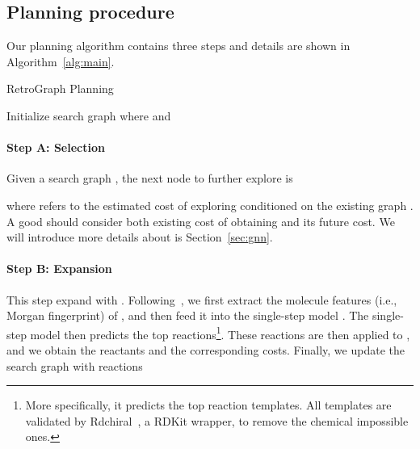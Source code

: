 \documentclass[sigconf]{acmart}
\begin{document}
\subsection{Planning procedure}
Our planning algorithm contains three steps and details are shown in Algorithm~\ref{alg:main}.



\begin{algorithm}[tb]
\caption{RetroGraph Planning}\label{alg:main}
Initialize search graph  where  and \;
\end{algorithm}

\paragraph{Step A: Selection}
Given a search graph , the next node to further explore is

where  refers to the estimated cost of exploring  conditioned on the existing graph . A good  should consider both existing cost of obtaining  and its future cost. We will introduce more details about  is Section~\ref{sec:gnn}. 


\paragraph{Step B: Expansion}
This step expand  with .
Following~\cite{Chen2020,Kim2021}, we first extract the molecule features (i.e., Morgan fingerprint) of , and then feed it into the single-step model .
The single-step model then predicts the top  reactions\footnote{More specifically, it predicts the top  reaction templates. All templates are validated by Rdchiral~\citep{coley2019rdchiral}, a RDKit wrapper,  to remove the chemical impossible ones.}. These reactions are then applied to , and we obtain the reactants and the corresponding costs.
Finally, we update the search graph  with reactions  
\end{document}

